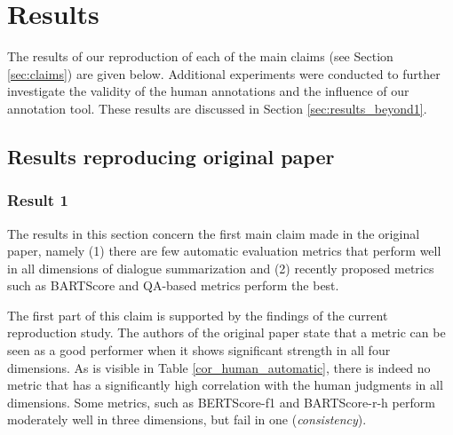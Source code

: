 \section{Results}
\label{sec:results}
The results of our reproduction of each of the main claims (see Section \ref{sec:claims}) are given below. Additional experiments were conducted to further investigate the validity of the human annotations and the influence of our annotation tool. These results are discussed in Section \ref{sec:results_beyond1}.


\subsection{Results reproducing original paper}
\label{sec:results_orig}


\subsubsection{Result 1} 
The results in this section concern the first main claim made in the original paper, namely (1) there are few automatic evaluation metrics that perform well in all dimensions of dialogue summarization and (2) recently proposed metrics such as BARTScore and QA-based metrics perform the best. 

The first part of this claim is supported by the findings of the current reproduction study. The authors of the original paper state that a metric can be seen as a good performer when it shows significant strength in all four dimensions. As is visible in Table \ref{cor_human_automatic}, there is indeed no metric that has a significantly high correlation with the human judgments in all dimensions. Some metrics, such as BERTScore-f1 and BARTScore-r-h perform moderately well in three dimensions, but fail in one (\textit{consistency}). 

